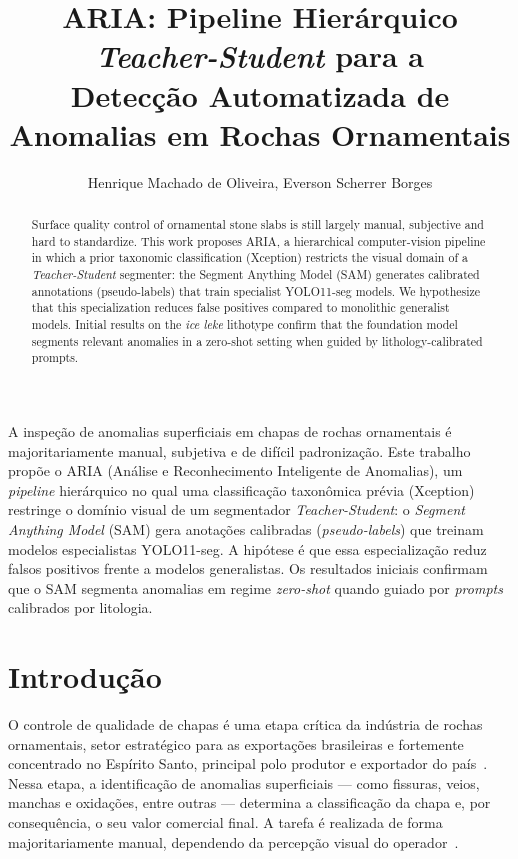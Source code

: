 \documentclass[12pt]{article}
\title{ARIA: Pipeline Hierárquico \textit{Teacher-Student} para a\\
  Detecção Automatizada de Anomalias em Rochas Ornamentais}
\author{Henrique Machado de Oliveira\inst{1}, Everson Scherrer Borges\inst{1}}
\begin{document}
\maketitle

\begin{abstract}
  Surface quality control of ornamental stone slabs is still largely manual, subjective and hard to standardize. This work proposes ARIA, a hierarchical computer-vision pipeline in which a prior taxonomic classification (Xception) restricts the visual domain of a \textit{Teacher-Student} segmenter: the Segment Anything Model (SAM) generates calibrated annotations (pseudo-labels) that train specialist YOLO11-seg models. We hypothesize that this specialization reduces false positives compared to monolithic generalist models. Initial results on the \textit{ice leke} lithotype confirm that the foundation model segments relevant anomalies in a zero-shot setting when guided by lithology-calibrated prompts.

\end{abstract}

\begin{resumo}
  A inspeção de anomalias superficiais em chapas de rochas ornamentais é majoritariamente manual, subjetiva e de difícil padronização. Este trabalho propõe o ARIA (Análise e Reconhecimento Inteligente de Anomalias), um \textit{pipeline} hierárquico no qual uma classificação taxonômica prévia (Xception) restringe o domínio visual de um segmentador \textit{Teacher-Student}: o \textit{Segment Anything Model} (SAM) gera anotações calibradas (\textit{pseudo-labels}) que treinam modelos especialistas YOLO11-seg. A hipótese é que essa especialização reduz falsos positivos frente a modelos generalistas. Os resultados iniciais confirmam que o SAM segmenta anomalias em regime \textit{zero-shot} quando guiado por \textit{prompts} calibrados por litologia.
\end{resumo}

\section{Introdução}

O controle de qualidade de chapas é uma etapa crítica da indústria de rochas ornamentais, setor estratégico para as exportações brasileiras e fortemente concentrado no Espírito Santo, principal polo produtor e exportador do país~\cite{stone_economy_bahiense2023}. Nessa etapa, a identificação de anomalias superficiais --- como fissuras, veios, manchas e oxidações, entre outras --- determina a classificação da chapa e, por consequência, o seu valor comercial final. A tarefa é realizada de forma majoritariamente manual, dependendo da percepção visual do operador~\cite{stone_inspection_vidal2013}.
\end{document}
